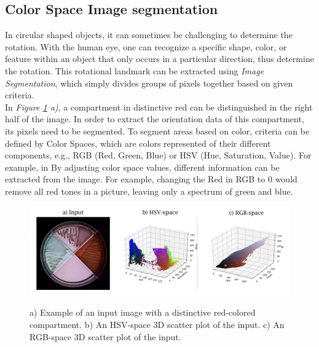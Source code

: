 \subsection{Color Space Image segmentation}
In circular shaped objects, it can sometimes be challenging to determine the rotation. With the human eye, one can recognize a specific shape, color, or feature within an object that only occurs in a particular direction, thus determine the rotation. This rotational landmark can be extracted using \textit{Image Segmentation}\cite{Rahmat}, which simply divides groups of pixels together based on given criteria.\\  


\noindent In \textit{Figure \ref{fig:segmentation} a)}, a compartment in distinctive red can be distinguished in the right half of the image. In order to extract the orientation data of this compartment, its pixels need to be segmented. To segment areas based on color, criteria can be defined by Color Spaces, which are colors represented of their different components, e.g., RGB (Red, Green, Blue) or HSV (Hue, Saturation, Value). For example, in 
By adjusting color space values, different information can be extracted from the image. For example, changing the Red in RGB to 0 would remove all red tones in a picture, leaving only a spectrum of green and blue.\\

\begin{figure}[H]
    \centering
     \includegraphics[width=1.1\linewidth]{figures/PDF/Color_space.pdf}\\
    \caption{{a) Example of an input image with a distinctive red-colored compartment. b) An HSV-space 3D scatter plot of the input. c) An RGB-space 3D scatter plot of the input.}}
    \label{fig:segmentation}
\end{figure}


